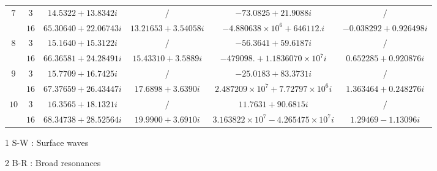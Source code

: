 \documentclass[aps,prd,longbibliography,reprint,twocolumn,amsmath,amssymb,amsfonts,showpacs,superscriptaddress]{revtex4-1}%
\begin{document}
\begin{table}[htp]
\begin{threeparttable}[htp]
\begin{ruledtabular}
\begin{tabular}{cccccc}
$7$  & $3$  & $14.5322+13.8342 i$  & $/$   & $-73.0825+21.9088 i$ & $/$     \\
     & $16$  & $65.30640+22.06743 i$  & $13.21653+3.54058 i$  & $-4.880638\times 10^6+646112. i$  & $-0.038292+0.926498 i$    \\

$8$  & $3$  & $15.1640+15.3122 i$  & $/$   & $-56.3641+59.6187 i$ & $/$     \\
     & $16$  & $66.36581+24.28491 i$  & $15.43310+3.5889 i$  & $-479098.+1.1836070\times 10^7 i$  & $0.652285+0.920876 i$    \\

$9$  & $3$  & $15.7709+16.7425 i$  & $/$   & $-25.0183+83.3731 i$ & $/$     \\
     & $16$  & $67.37659+26.43447 i$  & $17.6898+3.6390 i$  & $2.487209\times 10^7+7.72797\times 10^6 i$  & $1.363464+0.248276 i$    \\

$10$  & $3$  & $16.3565+18.1321 i$  & $/$   & $11.7631+90.6815 i$ & $/$     \\
     & $16$  & $68.34738+28.52564 i $  & $19.9900+3.6910 i$  & $3.163822\times 10^7-4.265475\times 10^7 i$  & $1.29469-1.13096 i$    \\
\end{tabular}
\end{ruledtabular}
\begin{tablenotes}
     \item[1] S-W : Surface waves
     \item[2] B-R : Broad resonances
   \end{tablenotes}
\end{threeparttable}
\end{table}
\endgroup
\end{document}
